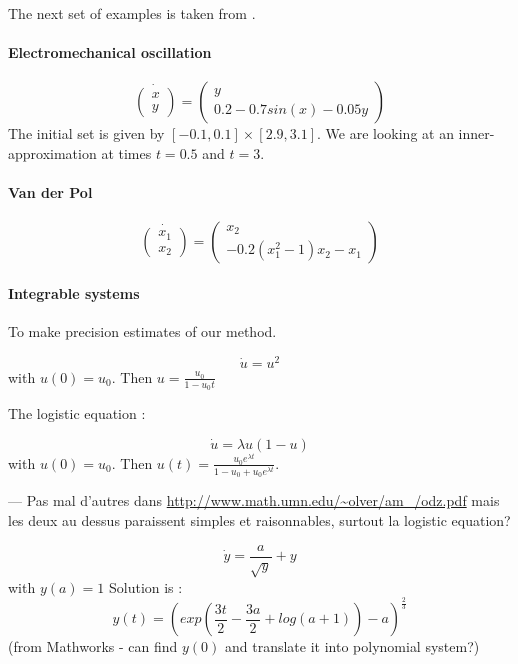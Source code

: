 \documentclass{sig-alternate-05-2015} %
\newcommand\ForAuthors[1]%
 {\par\smallskip                     %
  \begin{center}%
   \fbox%
   {\parbox{0.9\linewidth}%
    {\raggedright\sc--- #1}%
   }%
  \end{center}%
  \par\smallskip                     %
 }
\begin{document}
The next set of examples is taken from \cite{underapprox16}. 

\paragraph{Electromechanical oscillation}

\begin{equation}
\dot{\left(\begin{array}{c}
x \\
y
\end{array}\right)} = \left(\begin{array}{c}
y \\
0.2-0.7sin(x)-0.05y
\end{array}\right)
\end{equation}
The initial set is given by $[-0.1,0.1]\times [2.9,3.1]$. We are looking at an 
inner-approximation at times $t=0.5$ and $t=3$. 

\paragraph{Van der Pol}

\begin{equation}
\dot{\left(\begin{array}{c}
x_1 \\
x_2
\end{array}\right)} = \left(\begin{array}{c}
x_2 \\
-0.2(x^2_1-1)x_2-x_1
\end{array}\right)
\end{equation}

\paragraph{Integrable systems}
To make precision estimates of our method. 

$$\dot{u}=u^2$$
\noindent with $u(0)=u_0$. 
Then $u=\frac{u_0}{1-u_0t}$

The logistic equation :

$$\dot{u}=\lambda u(1-u)$$
\noindent with $u(0)=u_0$. Then
$u(t)=\frac{u_0e^{\lambda t}}{1-u_0+u_0e^{\lambda t}}$.

\ForAuthors{Pas mal d'autres dans \url{http://www.math.umn.edu/~olver/am_/odz.pdf} mais les deux au dessus paraissent simples et raisonnables, surtout la 
logistic equation?}

$$\dot{y} = \frac{a}{\sqrt{y}}+y$$
\noindent with $y(a)=1$
Solution is :
$$y(t)=\left(exp\left(\frac{3t}{2} - \frac{3a}{2} + log(a + 1)\right) - a\right)^{\frac{2}{3}}$$
(from Mathworks - can find $y(0)$ and translate it into polynomial system?)
\end{document}
